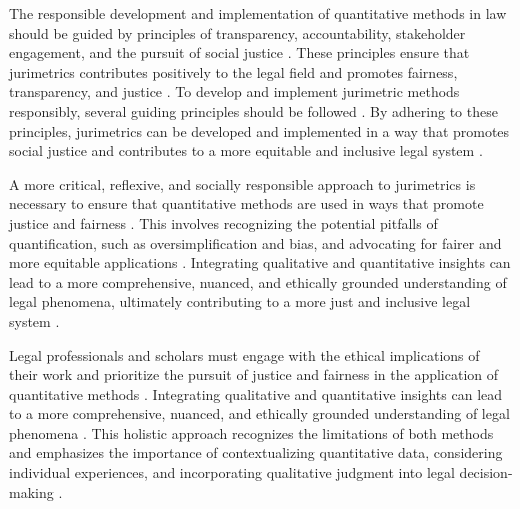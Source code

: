 The responsible development and implementation of quantitative methods in law should be guided by principles of transparency, accountability, stakeholder engagement, and the pursuit of social justice \cite{10.1007/s11186-021-09453-1,international2015}. These principles ensure that jurimetrics contributes positively to the legal field and promotes fairness, transparency, and justice \cite{10.1007/s11186-021-09453-1,international2015}. To develop and implement jurimetric methods responsibly, several guiding principles should be followed \cite{10.1007/s11186-021-09453-1,international2015}. By adhering to these principles, jurimetrics can be developed and implemented in a way that promotes social justice and contributes to a more equitable and inclusive legal system \cite{unger2021process}.

A more critical, reflexive, and socially responsible approach to jurimetrics is necessary to ensure that quantitative methods are used in ways that promote justice and fairness \cite{10.1590/data.2022.65.3.267,loevinger1959}. This involves recognizing the potential pitfalls of quantification, such as oversimplification and bias, and advocating for fairer and more equitable applications \cite{10.1590/data.2022.65.3.267,loevinger1959}. Integrating qualitative and quantitative insights can lead to a more comprehensive, nuanced, and ethically grounded understanding of legal phenomena, ultimately contributing to a more just and inclusive legal system \cite{10.1590/data.2022.65.3.267,loevinger1959}.

Legal professionals and scholars must engage with the ethical implications of their work and prioritize the pursuit of justice and fairness in the application of quantitative methods \cite{10.1007/s11186-021-09453-1,10.3390/fi9040068}. Integrating qualitative and quantitative insights can lead to a more comprehensive, nuanced, and ethically grounded understanding of legal phenomena \cite{10.1007/s11186-021-09453-1,10.3390/fi9040068}. This holistic approach recognizes the limitations of both methods and emphasizes the importance of contextualizing quantitative data, considering individual experiences, and incorporating qualitative judgment into legal decision-making \cite{10.1007/s11186-021-09453-1,10.3390/fi9040068}.

